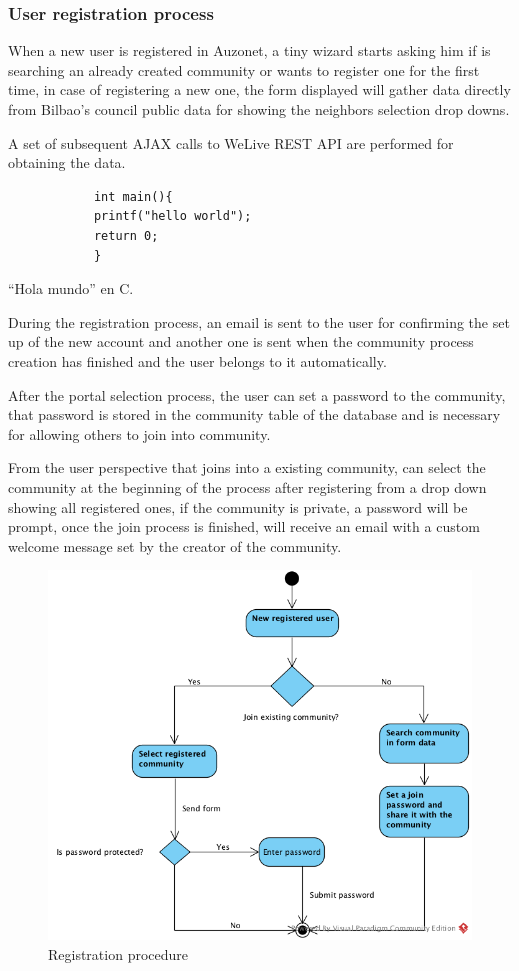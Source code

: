\documentclass{DeustoFDP}
\begin{document}
\subsubsection{User registration process}
When a new user is registered in Auzonet, a tiny wizard starts asking him if is searching an already created community or wants to register one for the first time, in case of registering a new one, the form displayed will gather data directly from Bilbao's council public data for showing the neighbors selection drop downs.

A set of subsequent AJAX calls to WeLive REST API are performed for obtaining the data.

\begin{listing}\centering
	\begin{minipage}{.4\textwidth}
		\begin{verbatim}
			int main(){
			printf("hello world");
			return 0;
			}
		\end{verbatim}
	\end{minipage}
	\caption{\enquote{Hola mundo} en C.}\label{lst:holamundo}
\end{listing}

During the registration process, an email is sent to the user for confirming the set up of the new account and another one is sent when the community process creation has finished and the user belongs to it automatically.

After the portal selection process, the user can set a password to the community, that password is stored in the community table of the database and is necessary for allowing others to join into community.

From the user perspective that joins into a existing community, can select the community at the beginning of the process after registering from a drop down showing all registered ones, if the community is private, a password will be prompt, once the join process is finished, will receive an email with a custom welcome message set by the creator of the community.

\begin{figure}[h]
\centering
\includegraphics[width=0.7\linewidth]{fig/Registerflow}
\caption[Registration procedure]{Registration procedure}
\label{fig:Registerflow}
\end{figure}
\end{document}
